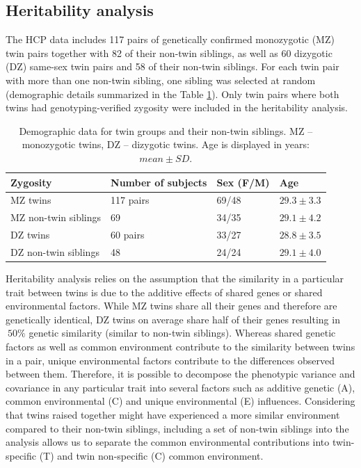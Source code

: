\subsection{Heritability analysis}
\label{sec:Heritability}

The HCP data includes 117 pairs of genetically confirmed monozygotic (MZ) twin pairs together with 82 of their non-twin siblings, as well as 60 dizygotic (DZ) same-sex twin pairs and 58 of their non-twin siblings. For each twin pair with more than one non-twin sibling, one sibling was selected at random (demographic details summarized in the Table \ref{Ch5Table1}). Only twin pairs where both twins had genotyping-verified zygosity were included in the heritability analysis.

\begin{table}[h!]
\centering
\caption{Demographic data for twin groups and their non-twin siblings. MZ -- monozygotic twins, DZ -- dizygotic twins. Age is displayed in years: $mean \pm SD$.}
\label{Ch5Table1}
\begin{tabular}{@{}llll@{}}
\toprule
\textbf{Zygosity} & \textbf{Number of subjects} & \textbf{Sex (F/M)} & \textbf{Age} \\ \midrule
MZ twins & 117 pairs & 69/48 & $29.3 \pm 3.3$ \\
MZ non-twin siblings & 69 & 34/35 & $29.1 \pm 4.2$ \\
DZ twins & 60 pairs & 33/27 & $28.8 \pm 3.5$ \\
DZ non-twin siblings & 48 & 24/24 & $29.1 \pm 4.0$ \\ \bottomrule
\end{tabular}
\end{table}

Heritability analysis relies on the assumption that the similarity in a particular trait between twins is due to the additive effects of shared genes or shared environmental factors. While MZ twins share all their genes and therefore are genetically identical, DZ twins on average share half of their genes resulting in $~50\%$ genetic similarity (similar to non-twin siblings). Whereas shared genetic factors as well as common environment contribute to the similarity between twins in a pair, unique environmental factors contribute to the differences observed between them. Therefore, it is possible to decompose the phenotypic variance and covariance in any particular trait into several factors such as additive genetic (A), common environmental (C) and unique environmental (E) influences. Considering that twins raised together might have experienced a more similar environment compared to their non-twin siblings, including a set of non-twin siblings into the analysis allows us to separate the common environmental contributions into twin-specific (T) and twin non-specific (C) common environment.

